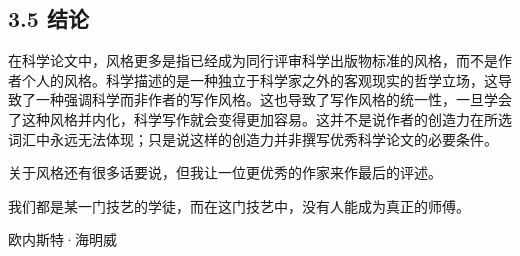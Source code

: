 \subsection*{3.5 结论}
在科学论文中，风格更多是指已经成为同行评审科学出版物标准的风格，而不是作者个人的风格。科学描述的是一种独立于科学家之外的客观现实的哲学立场，这导致了一种强调科学而非作者的写作风格。这也导致了写作风格的统一性，一旦学会了这种风格并内化，科学写作就会变得更加容易。这并不是说作者的创造力在所选词汇中永远无法体现；只是说这样的创造力并非撰写优秀科学论文的必要条件。

关于风格还有很多话要说，但我让一位更优秀的作家来作最后的评述。

我们都是某一门技艺的学徒，而在这门技艺中，没有人能成为真正的师傅。

欧内斯特·海明威

